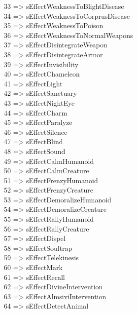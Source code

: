 33 =\textgreater{} sEffectWeaknessToBlightDisease\\
34 =\textgreater{} sEffectWeaknessToCorprusDisease\\
35 =\textgreater{} sEffectWeaknessToPoison\\
36 =\textgreater{} sEffectWeaknessToNormalWeapons\\
37 =\textgreater{} sEffectDisintegrateWeapon\\
38 =\textgreater{} sEffectDisintegrateArmor\\
39 =\textgreater{} sEffectInvisibility\\
40 =\textgreater{} sEffectChameleon\\
41 =\textgreater{} sEffectLight\\
42 =\textgreater{} sEffectSanctuary\\
43 =\textgreater{} sEffectNightEye\\
44 =\textgreater{} sEffectCharm\\
45 =\textgreater{} sEffectParalyze\\
46 =\textgreater{} sEffectSilence\\
47 =\textgreater{} sEffectBlind\\
48 =\textgreater{} sEffectSound\\
49 =\textgreater{} sEffectCalmHumanoid\\
50 =\textgreater{} sEffectCalmCreature\\
51 =\textgreater{} sEffectFrenzyHumanoid\\
52 =\textgreater{} sEffectFrenzyCreature\\
53 =\textgreater{} sEffectDemoralizeHumanoid\\
54 =\textgreater{} sEffectDemoralizeCreature\\
55 =\textgreater{} sEffectRallyHumanoid\\
56 =\textgreater{} sEffectRallyCreature\\
57 =\textgreater{} sEffectDispel\\
58 =\textgreater{} sEffectSoultrap\\
59 =\textgreater{} sEffectTelekinesis\\
60 =\textgreater{} sEffectMark\\
61 =\textgreater{} sEffectRecall\\
62 =\textgreater{} sEffectDivineIntervention\\
63 =\textgreater{} sEffectAlmsiviIntervention\\
64 =\textgreater{} sEffectDetectAnimal\\
